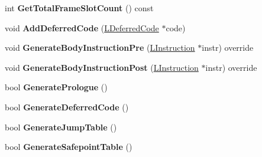 \begin{DoxyCompactItemize}
\item 
int {\bfseries Get\+Total\+Frame\+Slot\+Count} () const \hypertarget{classv8_1_1internal_1_1_l_code_gen_a7e0a34008896a2d4d09dab6f216df9cc}{}\label{classv8_1_1internal_1_1_l_code_gen_a7e0a34008896a2d4d09dab6f216df9cc}

\item 
void {\bfseries Add\+Deferred\+Code} (\hyperlink{classv8_1_1internal_1_1_l_deferred_code}{L\+Deferred\+Code} $\ast$code)\hypertarget{classv8_1_1internal_1_1_l_code_gen_a136807d3acd05ca71821c19ab49ef581}{}\label{classv8_1_1internal_1_1_l_code_gen_a136807d3acd05ca71821c19ab49ef581}

\item 
void {\bfseries Generate\+Body\+Instruction\+Pre} (\hyperlink{classv8_1_1internal_1_1_l_instruction}{L\+Instruction} $\ast$instr) override\hypertarget{classv8_1_1internal_1_1_l_code_gen_a85d4251ce8010cd6b04358d6f54e1d13}{}\label{classv8_1_1internal_1_1_l_code_gen_a85d4251ce8010cd6b04358d6f54e1d13}

\item 
void {\bfseries Generate\+Body\+Instruction\+Post} (\hyperlink{classv8_1_1internal_1_1_l_instruction}{L\+Instruction} $\ast$instr) override\hypertarget{classv8_1_1internal_1_1_l_code_gen_aad9fc88d51d97648fb770f64ef370b57}{}\label{classv8_1_1internal_1_1_l_code_gen_aad9fc88d51d97648fb770f64ef370b57}

\item 
bool {\bfseries Generate\+Prologue} ()\hypertarget{classv8_1_1internal_1_1_l_code_gen_aff05496f75e5706dc01028ef21cd2065}{}\label{classv8_1_1internal_1_1_l_code_gen_aff05496f75e5706dc01028ef21cd2065}

\item 
bool {\bfseries Generate\+Deferred\+Code} ()\hypertarget{classv8_1_1internal_1_1_l_code_gen_a7edbe3129e1ff758f4c3d471d6038aee}{}\label{classv8_1_1internal_1_1_l_code_gen_a7edbe3129e1ff758f4c3d471d6038aee}

\item 
bool {\bfseries Generate\+Jump\+Table} ()\hypertarget{classv8_1_1internal_1_1_l_code_gen_af066f353885f2f3cec35f74445989328}{}\label{classv8_1_1internal_1_1_l_code_gen_af066f353885f2f3cec35f74445989328}

\item 
bool {\bfseries Generate\+Safepoint\+Table} ()\hypertarget{classv8_1_1internal_1_1_l_code_gen_aa8cc24b1134b87ea8ce0a9a5c5688b5a}{}\label{classv8_1_1internal_1_1_l_code_gen_aa8cc24b1134b87ea8ce0a9a5c5688b5a}


\end{DoxyCompactItemize}
